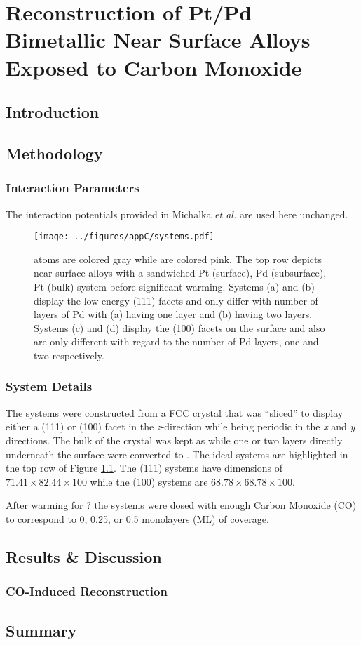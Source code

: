 
\chapter{Reconstruction of Pt/Pd Bimetallic Near Surface Alloys Exposed to Carbon Monoxide}


\section{Introduction}

\section{Methodology}

\subsection{Interaction Parameters}
The interaction potentials provided in Michalka {\em et
al.}\citep{Michalka:2015aa} are used here unchanged.


\begin{landscape}
\begin{figure}[p!]
\centering
  \texttt{[image: ../figures/appC/systems.pdf]}
  \caption{ atoms are colored gray while  are colored pink. The
top row depicts near surface alloys with a sandwiched Pt (surface), Pd
(subsurface), Pt (bulk) system before significant warming. Systems (a) and (b)
display the low-energy (111) facets and only differ with number of layers of Pd
with (a) having one layer and (b) having two layers. Systems (c) and (d)
display the (100) facets on the surface and also are only different with regard
to the number of Pd layers, one and two respectively.}
\label{fig:biSystems}
\end{figure}
\end{landscape}

\subsection{System Details}
The systems were constructed from a FCC  crystal that was ``sliced'' to
display either a (111) or (100) facet in the {\em z}-direction while being
periodic in the {\em x} and {\em y} directions. The bulk of the crystal was
kept as  while one or two layers directly underneath the surface were
converted to . The ideal systems are highlighted in the top row of
Figure \ref{fig:biSystems}. The (111) systems have dimensions of $71.41\times82.44\times100$ while the (100) systems are $68.78\times68.78\times100$.

After warming for ? the systems were dosed with enough Carbon Monoxide (CO) to correspond to 0, 0.25, or 0.5 monolayers (ML) of coverage.




\section{Results \& Discussion}

\subsection{CO-Induced Reconstruction}

\section{Summary}

